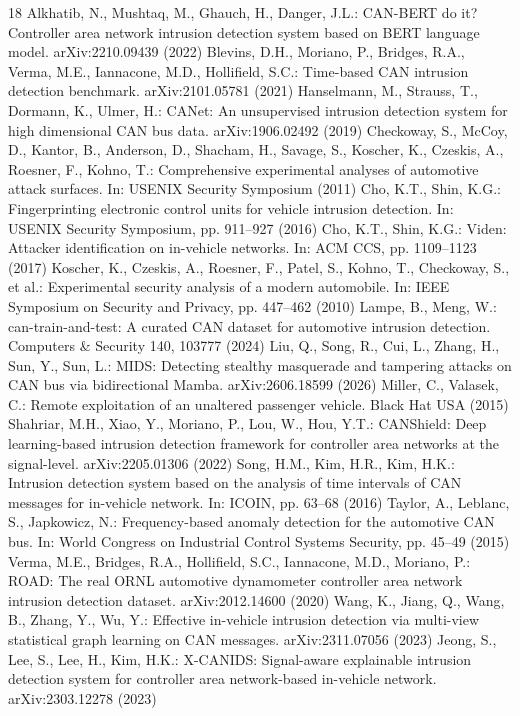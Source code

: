 \documentclass[runningheads]{llncs}
\begin{document}
\begin{thebibliography}{18}
 Alkhatib, N., Mushtaq, M., Ghauch, H., Danger, J.L.: CAN-BERT do it? Controller area network intrusion detection system based on BERT language model. arXiv:2210.09439 (2022)
 Blevins, D.H., Moriano, P., Bridges, R.A., Verma, M.E., Iannacone, M.D., Hollifield, S.C.: Time-based CAN intrusion detection benchmark. arXiv:2101.05781 (2021)
 Hanselmann, M., Strauss, T., Dormann, K., Ulmer, H.: CANet: An unsupervised intrusion detection system for high dimensional CAN bus data. arXiv:1906.02492 (2019)
 Checkoway, S., McCoy, D., Kantor, B., Anderson, D., Shacham, H., Savage, S., Koscher, K., Czeskis, A., Roesner, F., Kohno, T.: Comprehensive experimental analyses of automotive attack surfaces. In: USENIX Security Symposium (2011)
 Cho, K.T., Shin, K.G.: Fingerprinting electronic control units for vehicle intrusion detection. In: USENIX Security Symposium, pp. 911--927 (2016)
 Cho, K.T., Shin, K.G.: Viden: Attacker identification on in-vehicle networks. In: ACM CCS, pp. 1109--1123 (2017)
 Koscher, K., Czeskis, A., Roesner, F., Patel, S., Kohno, T., Checkoway, S., et al.: Experimental security analysis of a modern automobile. In: IEEE Symposium on Security and Privacy, pp. 447--462 (2010)
 Lampe, B., Meng, W.: can-train-and-test: A curated CAN dataset for automotive intrusion detection. Computers \& Security 140, 103777 (2024)
 Liu, Q., Song, R., Cui, L., Zhang, H., Sun, Y., Sun, L.: MIDS: Detecting stealthy masquerade and tampering attacks on CAN bus via bidirectional Mamba. arXiv:2606.18599 (2026)
 Miller, C., Valasek, C.: Remote exploitation of an unaltered passenger vehicle. Black Hat USA (2015)
 Shahriar, M.H., Xiao, Y., Moriano, P., Lou, W., Hou, Y.T.: CANShield: Deep learning-based intrusion detection framework for controller area networks at the signal-level. arXiv:2205.01306 (2022)
 Song, H.M., Kim, H.R., Kim, H.K.: Intrusion detection system based on the analysis of time intervals of CAN messages for in-vehicle network. In: ICOIN, pp. 63--68 (2016)
 Taylor, A., Leblanc, S., Japkowicz, N.: Frequency-based anomaly detection for the automotive CAN bus. In: World Congress on Industrial Control Systems Security, pp. 45--49 (2015)
 Verma, M.E., Bridges, R.A., Hollifield, S.C., Iannacone, M.D., Moriano, P.: ROAD: The real ORNL automotive dynamometer controller area network intrusion detection dataset. arXiv:2012.14600 (2020)
 Wang, K., Jiang, Q., Wang, B., Zhang, Y., Wu, Y.: Effective in-vehicle intrusion detection via multi-view statistical graph learning on CAN messages. arXiv:2311.07056 (2023)
 Jeong, S., Lee, S., Lee, H., Kim, H.K.: X-CANIDS: Signal-aware explainable intrusion detection system for controller area network-based in-vehicle network. arXiv:2303.12278 (2023)
\end{thebibliography}
\end{document}
